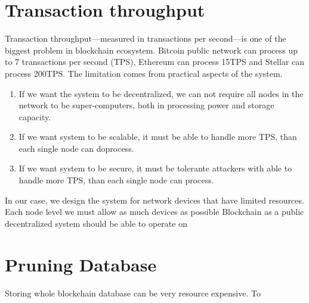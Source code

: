 \section{Transaction throughput}
Transaction throughput––measured in transactions per second––is one of the biggest problem in blockchain ecosystem. Bitcoin public network can process up to 7 transactions per second (TPS), Ethereum can process 15TPS and Stellar can process 200TPS. The limitation comes from practical aspects of the system. 
\begin{enumerate}
    \item If we want the system to be decentralized, we can not require all nodes in the network to be super-computers, both in processing power and storage capacity. 
    \item If we want system to be scalable, it must be able to handle more TPS, than each single node can doprocess.
    \item If we want system to be secure, it must be tolerante attackers with   able to handle more TPS, than each single node can process.
\end{enumerate}
In our case, we design the system for network devices that have limited resources. Each node level we must allow as much devices as possible   Blockchain as a public decentralized system should be able to operate on

\section{Pruning Database}
Storing whole blockchain database can be very resource expensive. To 
